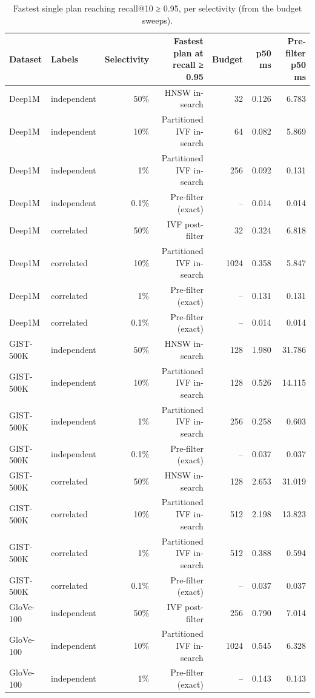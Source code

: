 \begin{table}[t]
\centering\small
\caption{Fastest single plan reaching recall@10 ≥ 0.95, per selectivity (from the budget sweeps).}
\label{tab:best_plan}
\begin{tabular}{llrrrrr}
\toprule
Dataset & Labels & Selectivity & Fastest plan at recall ≥ 0.95 & Budget & p50 ms & Pre-filter p50 ms \\
\midrule
Deep1M & independent & 50\% & HNSW in-search & 32 & 0.126 & 6.783 \\
Deep1M & independent & 10\% & Partitioned IVF in-search & 64 & 0.082 & 5.869 \\
Deep1M & independent & 1\% & Partitioned IVF in-search & 256 & 0.092 & 0.131 \\
Deep1M & independent & 0.1\% & Pre-filter (exact) & – & 0.014 & 0.014 \\
Deep1M & correlated & 50\% & IVF post-filter & 32 & 0.324 & 6.818 \\
Deep1M & correlated & 10\% & Partitioned IVF in-search & 1024 & 0.358 & 5.847 \\
Deep1M & correlated & 1\% & Pre-filter (exact) & – & 0.131 & 0.131 \\
Deep1M & correlated & 0.1\% & Pre-filter (exact) & – & 0.014 & 0.014 \\
GIST-500K & independent & 50\% & HNSW in-search & 128 & 1.980 & 31.786 \\
GIST-500K & independent & 10\% & Partitioned IVF in-search & 128 & 0.526 & 14.115 \\
GIST-500K & independent & 1\% & Partitioned IVF in-search & 256 & 0.258 & 0.603 \\
GIST-500K & independent & 0.1\% & Pre-filter (exact) & – & 0.037 & 0.037 \\
GIST-500K & correlated & 50\% & HNSW in-search & 128 & 2.653 & 31.019 \\
GIST-500K & correlated & 10\% & Partitioned IVF in-search & 512 & 2.198 & 13.823 \\
GIST-500K & correlated & 1\% & Partitioned IVF in-search & 512 & 0.388 & 0.594 \\
GIST-500K & correlated & 0.1\% & Pre-filter (exact) & – & 0.037 & 0.037 \\
GloVe-100 & independent & 50\% & IVF post-filter & 256 & 0.790 & 7.014 \\
GloVe-100 & independent & 10\% & Partitioned IVF in-search & 1024 & 0.545 & 6.328 \\
GloVe-100 & independent & 1\% & Pre-filter (exact) & – & 0.143 & 0.143 \\

\end{tabular}
\end{table}
